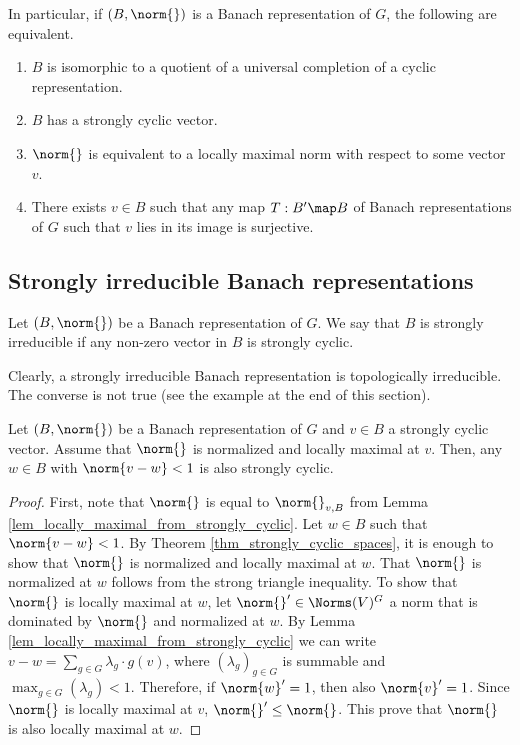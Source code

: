 In particular, if $(B,\norm{})$ is a Banach representation of $G$, the following are equivalent.
    \begin{enumerate}
    \item $B$ is isomorphic to a quotient of a universal completion of a cyclic representation.
    \item $B$ has a strongly cyclic vector.
    \item $\norm{}$ is equivalent to a locally maximal norm with respect to some vector $v$.
    \item There exists $v\in B$ such that any map $T:B'\map B$ of Banach representations of $G$ such that $v$ lies in its image is surjective.
    \end{enumerate}




\subsection{Strongly irreducible Banach representations}

\begin{defn}\label{def_strong_irreducible}
Let $(B,\norm{})$ be a Banach representation of $G$.
We say that $B$ is strongly irreducible if any non-zero vector in $B$ is strongly cyclic. 
\end{defn}
Clearly, a strongly irreducible Banach representation is topologically irreducible.
The converse is not true (see the example at the end of this section).

\begin{prop}\label{prop_open_unit_ball_of_strongly_cyclic}
Let $(B,\norm{})$ be a Banach representation of $G$ and $v\in B$ a strongly cyclic vector.
Assume that $\norm{}$ is normalized and locally maximal at $v$.
Then, any $w\in B$ with $\norm{v-w}<1$ is also strongly cyclic.
\end{prop} 
    \begin{proof}
    First, note that $\norm{}$ is equal to $\norm{}_{v,B}$ from Lemma \ref{lem_locally_maximal_from_strongly_cyclic}.
    Let $w\in B$ such that $\norm{v-w}<1$.
    By Theorem \ref{thm_strongly_cyclic_spaces}, it is enough to show that $\norm{}$ is normalized and locally maximal at $w$.
    That $\norm{}$ is normalized at $w$ follows from the strong triangle inequality.
    To show that $\norm{}$ is locally maximal at $w$, let $\norm{}'\in\Norms(V)^G$ a norm that is dominated by $\norm{}$ and normalized at $w$.
    By Lemma \ref{lem_locally_maximal_from_strongly_cyclic} we can write $v-w=\sum_{g\in G}\lambda_g\cdot g(v)$, where $(\lambda_g)_{g\in G}$ is summable and $\max_{g\in G}(\lambda_g)<1$.
    Therefore, if $\norm{w}'=1$, then also $\norm{v}'=1$.
    Since $\norm{}$ is locally maximal at $v$, $\norm{}'\leq \norm{}$.
    This prove that $\norm{}$ is also locally maximal at $w$.
    \end{proof} 

